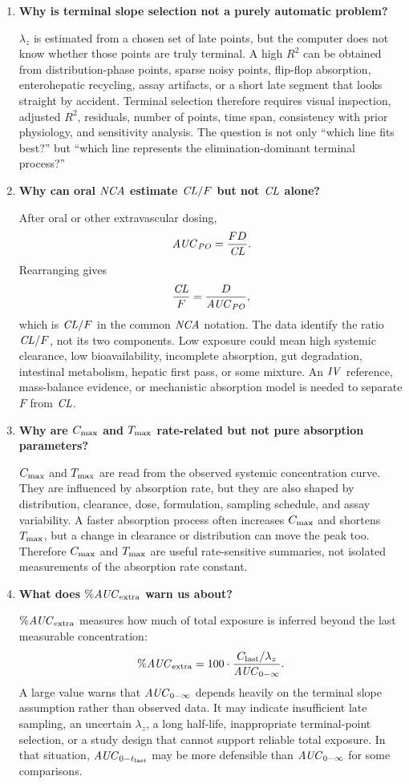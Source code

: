\documentclass[a4paper]{article}
\newcommand{\CL}{\ensuremath{\pksym{CL}}}
\newcommand{\CLF}{\ensuremath{\pksym{CL}/F}}
\newcommand{\AUC}{\ensuremath{\pksym{AUC}}}
\newcommand{\AUClast}{\ensuremath{\pksym{AUC}_{0-t_{\pklab{last}}}}}
\newcommand{\AUCinf}{\ensuremath{\pksym{AUC}_{0-\infty}}}
\newcommand{\Cmax}{\ensuremath{C_{\pklab{max}}}}
\newcommand{\Tmax}{\ensuremath{T_{\pklab{max}}}}
\newcommand{\Clast}{\ensuremath{C_{\pklab{last}}}}
\newcommand{\lambdaZ}{\ensuremath{\lambda_z}}
\newcommand{\NCA}{\ensuremath{\pksym{NCA}}}
\newcommand{\IV}{\ensuremath{\pksym{IV}}}
\newcommand{\PO}{\ensuremath{\pksym{PO}}}
\begin{document}
\begin{enumerate}[leftmargin=2em]
  \item \textbf{Why is terminal slope selection not a purely automatic problem?}

  \(\lambdaZ\) is estimated from a chosen set of late points, but the computer does not know whether those points are truly terminal. A high \(R^2\) can be obtained from distribution-phase points, sparse noisy points, flip-flop absorption, enterohepatic recycling, assay artifacts, or a short late segment that looks straight by accident. Terminal selection therefore requires visual inspection, adjusted \(R^2\), residuals, number of points, time span, consistency with prior physiology, and sensitivity analysis. The question is not only ``which line fits best?'' but ``which line represents the elimination-dominant terminal process?''

  \item \textbf{Why can oral \NCA{} estimate \(\CLF\) but not \CL{} alone?}

  After oral or other extravascular dosing,
  \[
    \AUC_{\PO}=\frac{F D}{\CL}.
  \]
  Rearranging gives
  \[
    \frac{\CL}{F}=\frac{D}{\AUC_{\PO}},
  \]
  which is \(\CLF\) in the common \NCA{} notation. The data identify the ratio \(\CL/F\), not its two components. Low exposure could mean high systemic clearance, low bioavailability, incomplete absorption, gut degradation, intestinal metabolism, hepatic first pass, or some mixture. An \IV{} reference, mass-balance evidence, or mechanistic absorption model is needed to separate \(F\) from \CL{}.

  \item \textbf{Why are \Cmax{} and \Tmax{} rate-related but not pure absorption parameters?}

  \Cmax{} and \Tmax{} are read from the observed systemic concentration curve. They are influenced by absorption rate, but they are also shaped by distribution, clearance, dose, formulation, sampling schedule, and assay variability. A faster absorption process often increases \Cmax{} and shortens \Tmax{}, but a change in clearance or distribution can move the peak too. Therefore \Cmax{} and \Tmax{} are useful rate-sensitive summaries, not isolated measurements of the absorption rate constant.

  \item \textbf{What does \(\%\pksym{AUC}_{\pklab{extra}}\) warn us about?}

  \(\%\pksym{AUC}_{\pklab{extra}}\) measures how much of total exposure is inferred beyond the last measurable concentration:
  \[
    \%\pksym{AUC}_{\pklab{extra}}
    =
    100\cdot
    \frac{\Clast/\lambdaZ}{\AUCinf}.
  \]
  A large value warns that \(\AUCinf\) depends heavily on the terminal slope assumption rather than observed data. It may indicate insufficient late sampling, an uncertain \(\lambdaZ\), a long half-life, inappropriate terminal-point selection, or a study design that cannot support reliable total exposure. In that situation, \AUClast{} may be more defensible than \AUCinf{} for some comparisons.


\end{enumerate}
\end{document}
